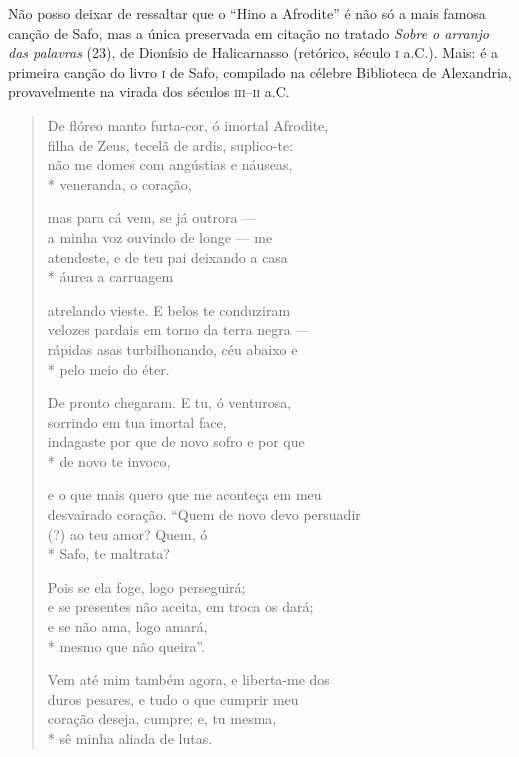 {Não posso deixar de ressaltar que o “Hino a Afrodite” é não só
a mais famosa canção de Safo, mas a única preservada em citação no tratado
\textit{Sobre o arranjo das palavras} (23), de Dionísio de Halicarnasso (retórico,
século \textsc{i} a.C.). Mais: é a primeira canção do livro \textsc{i} de Safo,
compilado na célebre Biblioteca de Alexandria, provavelmente na virada dos
séculos \textsc{iii}--\textsc{ii} a.C.}

\begin{verse}
De flóreo manto furta-cor, ó imortal Afrodite,\\
filha de Zeus, tecelã de ardis, suplico-te:\\
não me domes com angústias e náuseas,\\*
veneranda, o coração,

mas para cá vem, se já outrora ---\\
a minha voz ouvindo de longe --- me\\
atendeste, e de teu pai deixando a casa\\*
áurea a carruagem

atrelando vieste. E belos te conduziram\\
velozes pardais em torno da terra negra ---\\
rápidas asas turbilhonando, céu abaixo e\\*
pelo meio do éter.

De pronto chegaram. E tu, ó venturosa,\\
sorrindo em tua imortal face,\\
indagaste por que de novo sofro e por que\\*
de novo te invoco,

e o que mais quero que me aconteça em meu\\
desvairado coração. “Quem de novo devo \qb{}persuadir\\
(?) ao teu amor? Quem, ó\\*
Safo, te maltrata?

Pois se ela foge, logo perseguirá;\\
e se presentes não aceita, em troca os dará;\\
e se não ama, logo amará,\\*
mesmo que não queira”.

Vem até mim também agora, e liberta-me dos\\
duros pesares, e tudo o que cumprir meu\\
coração deseja, cumpre; e, tu mesma,\\*
sê minha aliada de lutas.
\end{verse}

